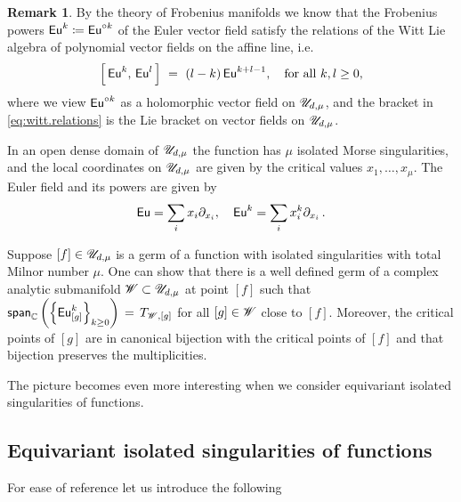 \documentclass[twoside,leqno]{article}
\numberwithin{equation}{section}
\theoremstyle{plain}
\theoremstyle{definition}
\newtheorem{remark}[equation]{Remark}
\begin{document}
\begin{remark} \label{rem:witt.move} 
By the theory of Frobenius manifolds \cite{Manin_Frobenius_manifolds} we know that the Frobenius powers $\operatorname{\mathsf{Eu}}^{k} \coloneqq \operatorname{\mathsf{Eu}}^{\circ k}$ of the Euler vector field satisfy the relations of the Witt Lie algebra of polynomial vector fields on the affine line, i.e.\ 
\begin{equation} \label{eq:witt.relations}
\left[\, \operatorname{\mathsf{Eu}}^{k}, \, \operatorname{\mathsf{Eu}}^{l}\,\right] \ = \ (l-k) \operatorname{\mathsf{Eu}}^{k+l-1}, \quad \text{for all} \ k, l \geq 0,
\end{equation}
where we view $\operatorname{\mathsf{Eu}}^{\circ k}$ as a holomorphic vector field on 
$\mathscr{U}_{d,\mu}$, and the bracket in \eqref{eq:witt.relations} is the Lie bracket on vector fields on $\mathscr{U}_{d,\mu}$. 

In an open dense domain of $\mathscr{U}_{d,\mu}$ the function has $\mu$ isolated Morse singularities, and the local coordinates on $\mathscr{U}_{d,\mu}$ are given by the critical values $x_1,\dots,x_\mu$. The Euler field and its powers are given by
$$ \operatorname{\mathsf{Eu}}=\sum_i x_i\partial_{x_i},\quad \operatorname{\mathsf{Eu}}^k=\sum_i x_i^k\partial_{x_i}\,.$$

Suppose $[f] \in \mathscr{U}_{d,\mu}$ is a germ of a function with isolated singularities with   total Milnor number $\mu$. One can show that there is a well defined germ of a complex analytic submanifold
$\mathscr{W} \subset \mathscr{U}_{d,\mu}$ at point $[f]$ such that $\mathsf{span}_{\mathbb C}\left(\left\{\operatorname{\mathsf{Eu}}^{k}_{[g]}\right\}_{k \geq 0}\right) \, = \, T_{\mathscr{W},[g]}$ for all $[g]\in \mathscr{W}$ close to $[f]$. 
Moreover, the  critical points of $[g]$ are in canonical bijection with the critical points of 
$[f]$ and that bijection preserves the multiplicities. 
\end{remark}

The picture becomes even more interesting when we consider equivariant isolated singularities of functions. 

\subsection{Equivariant isolated singularities of functions} \label{sec:equiv.singf}

For ease of reference let us introduce the following 
\end{document}
